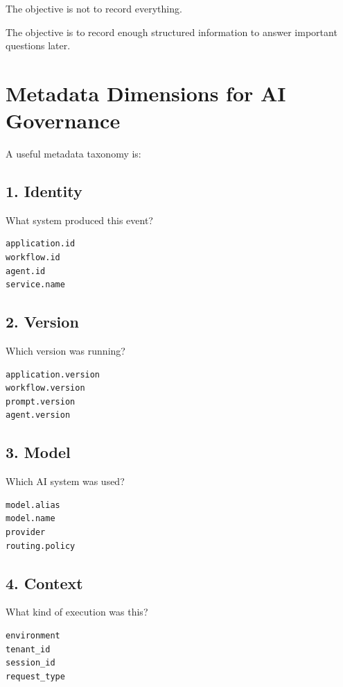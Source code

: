 \documentclass[11pt,a4paper]{article}
\begin{document}
The objective is not to record everything.

The objective is to record enough structured information to answer important questions later.

\section{Metadata Dimensions for AI Governance}

A useful metadata taxonomy is:

\subsection{1. Identity}

What system produced this event?

\begin{lstlisting}
application.id
workflow.id
agent.id
service.name
\end{lstlisting}

\subsection{2. Version}

Which version was running?

\begin{lstlisting}
application.version
workflow.version
prompt.version
agent.version
\end{lstlisting}

\subsection{3. Model}

Which AI system was used?

\begin{lstlisting}
model.alias
model.name
provider
routing.policy
\end{lstlisting}

\subsection{4. Context}

What kind of execution was this?

\begin{lstlisting}
environment
tenant_id
session_id
request_type
\end{lstlisting}
\end{document}
